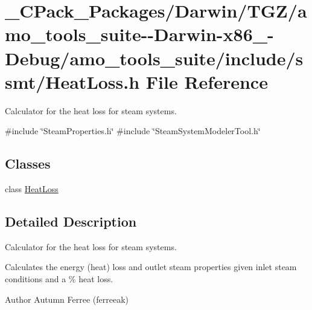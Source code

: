 \hypertarget{___c_pack___packages_2_darwin_2_t_g_z_2amo__tools__suite--_darwin-x86__64-_debug_2amo__tools__suceb65dfb1bdaeb070badbc2d0bcc30dd}{}\section{\+\_\+\+C\+Pack\+\_\+\+Packages/\+Darwin/\+T\+G\+Z/amo\+\_\+tools\+\_\+suite-\/-\/\+Darwin-\/x86\+\_-\/\+Debug/amo\+\_\+tools\+\_\+suite/include/ssmt/\+Heat\+Loss.h File Reference}
\label{___c_pack___packages_2_darwin_2_t_g_z_2amo__tools__suite--_darwin-x86__64-_debug_2amo__tools__suceb65dfb1bdaeb070badbc2d0bcc30dd}


Calculator for the heat loss for steam systems.  


{\ttfamily \#include \char`\"{}Steam\+Properties.\+h\char`\"{}}\newline
{\ttfamily \#include \char`\"{}Steam\+System\+Modeler\+Tool.\+h\char`\"{}}\newline
\subsection*{Classes}
\begin{DoxyCompactItemize}
\item 
class \hyperlink{class_heat_loss}{Heat\+Loss}
\end{DoxyCompactItemize}


\subsection{Detailed Description}
Calculator for the heat loss for steam systems. 

Calculates the energy (heat) loss and outlet steam properties given inlet steam conditions and a \% heat loss.

\begin{DoxyAuthor}{Author}
Autumn Ferree (ferreeak) 
\end{DoxyAuthor}
